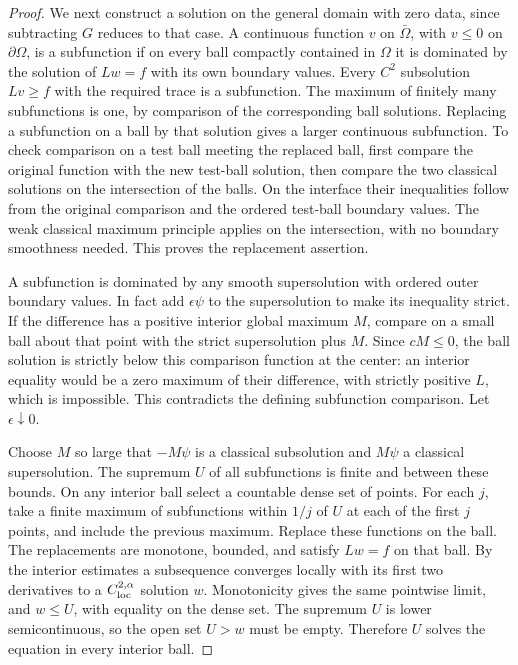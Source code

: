 \documentclass[11pt,oneside,openany]{book}
\theoremstyle{plain}
\theoremstyle{definition}
\theoremstyle{remark}
\begin{document}
\begin{proof}
We next construct a solution on the general domain with
zero data, since subtracting \(G\) reduces to that case.
A continuous function \(v\) on \(\bar\Omega\), with
\(v\leq0\) on \(\partial\Omega\), is a subfunction if on
every ball compactly contained in \(\Omega\) it is dominated
by the solution of \(Lw=f\) with its own boundary values.
Every \(C^2\) subsolution \(Lv\geq f\) with the required trace
is a subfunction. The maximum of finitely many subfunctions
is one, by comparison of the corresponding ball solutions.
Replacing a subfunction on a ball by that solution gives
a larger continuous subfunction. To check comparison on
a test ball meeting the replaced ball, first compare the
original function with the new test-ball solution, then
compare the two classical solutions on the intersection
of the balls. On the interface their inequalities follow
from the original comparison and the ordered test-ball
boundary values. The weak classical maximum principle
applies on the intersection, with no boundary smoothness
needed. This proves the replacement assertion.

A subfunction is dominated by any smooth supersolution
with ordered outer boundary values. In fact add
\(\epsilon\psi\) to the supersolution to make its inequality
strict. If the difference has a positive interior global
maximum \(M\), compare on a small ball about that point
with the strict supersolution plus \(M\). Since \(cM\leq0\),
the ball solution is strictly below this comparison function
at the center: an interior equality would be a zero
maximum of their difference, with strictly positive \(L\),
which is impossible. This contradicts the defining
subfunction comparison. Let \(\epsilon\downarrow0\).

Choose \(M\) so large that \(-M\psi\) is a classical
subsolution and \(M\psi\) a classical supersolution.
The supremum \(U\) of all subfunctions is finite and
between these bounds. On any interior ball select a
countable dense set of points. For each \(j\), take a finite
maximum of subfunctions within \(1/j\) of \(U\) at each of
the first \(j\) points, and include the previous maximum.
Replace these functions on the ball. The replacements
are monotone, bounded, and satisfy \(Lw=f\) on that ball.
By the interior estimates a subsequence converges locally
with its first two derivatives to a \(C^{2,\alpha}_{\rm loc}\)
solution \(w\). Monotonicity gives the same pointwise
limit, and \(w\leq U\), with equality on the dense set.
The supremum \(U\) is lower semicontinuous, so the open
set \(U>w\) must be empty. Therefore \(U\) solves the
equation in every interior ball.


\end{proof}
\end{document}
